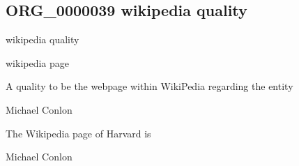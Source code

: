\documentclass[letterpaper,10pt,english]{sphinxmanual}
\begin{document}
\subsection{ORG\_0000039 \sphinxhyphen{} wikipedia quality}
\label{\detokenize{doc-ORG_0000039:org-0000039-wikipedia-quality}}\label{\detokenize{doc-ORG_0000039:index-0}}\label{\detokenize{doc-ORG_0000039::doc}}
\begin{sphinxShadowBox}

\sphinxAtStartPar
wikipedia quality
\end{sphinxShadowBox}

\begin{sphinxShadowBox}

\sphinxAtStartPar
wikipedia page
\end{sphinxShadowBox}

\begin{sphinxShadowBox}

\sphinxAtStartPar
{\hyperref[\detokenize{doc-BFO_0000019::doc}]{}}
\end{sphinxShadowBox}

\begin{sphinxShadowBox}

\sphinxAtStartPar
A quality to be the webpage within WikiPedia regarding the entity
\end{sphinxShadowBox}

\begin{sphinxShadowBox}

\sphinxAtStartPar
Michael Conlon 
\end{sphinxShadowBox}

\begin{sphinxShadowBox}

\sphinxAtStartPar
The Wikipedia page of Harvard is 
\end{sphinxShadowBox}

\begin{sphinxShadowBox}

\sphinxAtStartPar
Michael Conlon 
\end{sphinxShadowBox}
\begin{quote}

\ignorespaces \end{quote}
\end{document}
